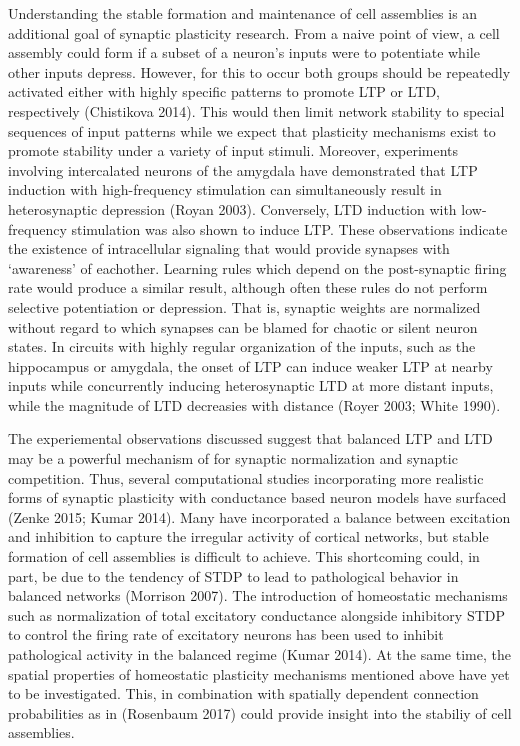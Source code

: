 \documentclass{ucetd}
\begin{document}
Understanding the stable formation and maintenance of cell assemblies is an additional goal of synaptic plasticity research. From a naive point of view, a cell assembly could form if a subset of a neuron's inputs were to potentiate while other inputs depress. However, for this to occur both groups should be repeatedly activated either with highly specific patterns to promote LTP or LTD, respectively (Chistikova 2014). This would then limit network stability to special sequences of input patterns while we expect that plasticity mechanisms exist to promote stability under a variety of input stimuli. Moreover, experiments involving intercalated neurons of the amygdala have demonstrated that LTP induction with high-frequency stimulation can simultaneously result in heterosynaptic depression (Royan 2003). Conversely, LTD induction with low-frequency stimulation was also shown to induce LTP. These observations indicate the existence of intracellular signaling that would provide synapses with `awareness' of eachother. Learning rules which depend on the post-synaptic firing rate would produce a similar result, although often these rules do not perform selective potentiation or depression. That is, synaptic weights are normalized without regard to which synapses can be blamed for chaotic or silent neuron states. In circuits with highly regular organization of the inputs, such as the hippocampus or amygdala, the onset of LTP can induce weaker LTP at nearby inputs while concurrently inducing heterosynaptic LTD at more distant inputs, while the magnitude of LTD decreasies with distance (Royer 2003; White 1990).

The experiemental observations discussed suggest that balanced LTP and LTD may be a powerful mechanism of for synaptic normalization and synaptic competition. Thus, several computational studies incorporating more realistic forms of synaptic plasticity with conductance based neuron models have surfaced (Zenke 2015; Kumar 2014). Many have incorporated a balance between excitation and inhibition to capture the irregular activity of cortical networks, but stable formation of cell assemblies is difficult to achieve. This shortcoming could, in part, be due to the tendency of STDP to lead to pathological behavior in balanced networks (Morrison 2007). The introduction of homeostatic mechanisms such as normalization of total excitatory conductance alongside inhibitory STDP to control the firing rate of excitatory neurons has been used to inhibit pathological activity in the balanced regime (Kumar 2014). At the same time, the spatial properties of homeostatic plasticity mechanisms mentioned above have yet to be investigated. This, in combination with spatially dependent connection probabilities as in (Rosenbaum 2017) could provide insight into the stabiliy of cell assemblies.
\end{document}

